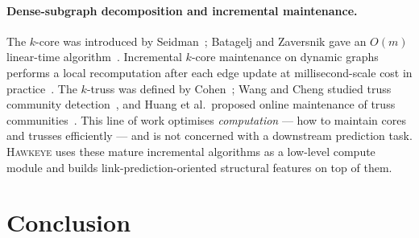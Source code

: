 \documentclass[sigconf,nonacm,review]{acmart}
\newcommand{\method}{\textsc{Hawkeye}\xspace}
\begin{document}
\paragraph{Dense-subgraph decomposition and incremental maintenance.}
The $k$-core was introduced by Seidman~\cite{seidman1983kcore}; Batagelj and
Zaversnik gave an $O(m)$ linear-time algorithm~\cite{batagelj2003cores}.
Incremental $k$-core maintenance on dynamic graphs performs a local
recomputation after each edge update at millisecond-scale cost in
practice~\cite{sariyuce2013kcorestream}. The $k$-truss was defined by
Cohen~\cite{cohen2008trusses}; Wang and Cheng studied truss community
detection~\cite{wang2012truss}, and Huang et al.\ proposed online maintenance of
truss communities~\cite{huang2014trusscommunity}. This line of work optimises
\emph{computation} --- how to maintain cores and trusses efficiently --- and is
not concerned with a downstream prediction task. \method uses these mature
incremental algorithms as a low-level compute module and builds
link-prediction-oriented structural features on top of them.

\section{Conclusion}
\label{sec:conclusion}
\end{document}

